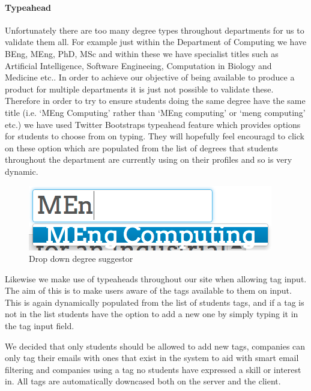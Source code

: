     \paragraph{Typeahead} Unfortunately there are too many degree types throughout departments for us to validate them all. For example just within the Department of Computing we have BEng, MEng, PhD, MSc and within these we have specialist titles such as Artificial Intelligence, Software Engineeing, Computation in Biology and Medicine etc.\cite{doc-ug-degrees}. In order to achieve our objective of being available to produce a product for multiple departments it is just not possible to validate these. Therefore in order to try to ensure students doing the same degree have the same title (i.e. `MEng Computing' rather than `MEng computing' or `meng computing' etc.) we have used Twitter Bootstraps typeahead feature which provides options for students to choose from on typing. They will hopefully feel encouragd to click on these option which are populated from the list of degrees that students throughout the department are currently using on their profiles and so is very dynamic.

    \begin{figure}[H]\centering
    \includegraphics[scale=0.5]{images/design/edit_suggestions}
    \caption{Drop down degree suggestor}
    \end{figure}

    Likewise we make use of typeaheads throughout our site when allowing tag input. The aim of this is to make users aware of the tags available to them on input. This is again dynamically populated from the list of students tags, and if a tag is not in the list students have the option to add a new one by simply typing it in the tag input field. 

    We decided that only students should be allowed to add new tags, companies can only tag their emails with ones that exist in the system to aid with smart email filtering and companies using a tag no students have expressed a skill or interest in.
    All tags are automatically downcased both on the server and the client.

